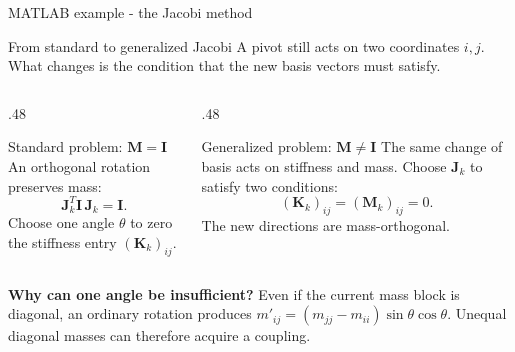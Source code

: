 \documentclass[aspectratio=169]{beamer}
\begin{document}
\begin{frame}{MATLAB example - the Jacobi method}
  \begin{center}
    \href{https://drive.mathworks.com/sharing/6a9792ef-d0a7-4aca-a1d0-8b1862b0ac3b}{}
  \end{center}
\end{frame}

\begin{frame}{From standard to generalized Jacobi}
  \small
  A pivot still acts on two coordinates $i,j$. What changes is the
  condition that the new basis vectors must satisfy.
  \begin{columns}[T,onlytextwidth]
    \begin{column}{.48\textwidth}
      \begin{block}{\small Standard problem: $\mathbf M=\mathbf I$}
        An orthogonal rotation preserves mass:
        \[
          \mathbf J_k^T\mathbf I\,\mathbf J_k=\mathbf I .
        \]
        Choose one angle $\theta$ to zero the stiffness entry
        $(\mathbf K_k)_{ij}$.
      \end{block}
    \end{column}
    \begin{column}{.48\textwidth}
      \begin{block}{\small Generalized problem:  $\mathbf M \neq \mathbf I$}
        The same change of basis acts on stiffness and mass. Choose
        $\mathbf J_k$ to satisfy two conditions:
        \[
          (\mathbf K_k)_{ij}=(\mathbf M_k)_{ij}=0 .
        \]
        The new directions are mass-orthogonal.
      \end{block}
    \end{column}
  \end{columns}
  \medskip
  \textbf{Why can one angle be insufficient?}
  Even if the current mass block is diagonal, an ordinary rotation produces
  $m'_{ij}=(m_{jj}-m_{ii})\sin\theta\cos\theta$.
  Unequal diagonal masses can therefore acquire a coupling.
\end{frame}
\end{document}
